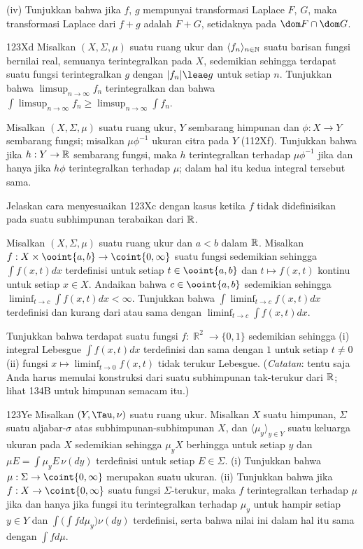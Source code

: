 {\quad(iv) Tunjukkan bahwa jika $f$, $g$ mempunyai transformasi Laplace
$F$, $G$, maka transformasi Laplace dari $f+g$ adalah $F+G$,
setidaknya pada $\dom F\cap \dom
G$.

\spheader 123Xd Misalkan $(X,\Sigma,\mu)$ suatu ruang ukur
dan $\langle f_n\rangle_{n\in\Bbb N}$ suatu barisan fungsi bernilai
real, semuanya terintegralkan pada $X$, sedemikian sehingga terdapat
suatu fungsi terintegralkan $g$ dengan $|f_n|\leae g$ untuk setiap $n$.
Tunjukkan bahwa $\limsup_{n\to\infty}f_n$ terintegralkan dan bahwa
$\int\limsup_{n\to\infty}f_n\ge\limsup_{n\to\infty}\int f_n$.

Misalkan $(X,\Sigma,\mu)$ suatu ruang ukur, $Y$ sembarang himpunan dan
$\phi:X\to Y$ sembarang fungsi; misalkan $\mu\phi^{-1}$ ukuran citra
pada $Y$ (112Xf). Tunjukkan bahwa jika $h:Y\to\Bbb R$ sembarang
fungsi, maka $h$ terintegralkan terhadap $\mu\phi^{-1}$ jika dan hanya
jika $h\phi$ terintegralkan terhadap $\mu$; dalam hal itu kedua integral
tersebut sama.

 Jelaskan cara menyesuaikan 123Xc dengan kasus
ketika $f$ tidak didefinisikan pada suatu subhimpunan terabaikan dari
$\Bbb R$.

 Misalkan $(X,\Sigma,\mu)$ suatu ruang ukur dan
$a<b$ dalam $\Bbb R$. Misalkan
$f:X\times\ooint{a,b}\to\coint{0,\infty}$ suatu fungsi sedemikian
sehingga $\int f(x,t)dx$ terdefinisi untuk setiap $t\in\ooint{a,b}$
dan $t\mapsto f(x,t)$ kontinu untuk setiap $x\in X$. Andaikan bahwa
$c\in\ooint{a,b}$ sedemikian sehingga
$\liminf_{t\to c}\int f(x,t)dx<\infty$.
Tunjukkan bahwa $\int\liminf_{t\to c}f(x,t)dx$ terdefinisi dan kurang
dari atau sama dengan $\liminf_{t\to c}\int f(x,t)dx$.

 Tunjukkan bahwa terdapat suatu fungsi
$f:\BbbR^2\to\{0,1\}$ sedemikian sehingga (i) integral Lebesgue
$\int f(x,t)dx$ terdefinisi dan sama dengan $1$ untuk setiap $t\ne 0$
(ii) fungsi $x\mapsto\liminf_{t\to 0}f(x,t)$ tidak terukur Lebesgue.
({\it Catatan\/}: tentu saja Anda harus memulai konstruksi dari suatu
subhimpunan tak-terukur dari $\Bbb R$; lihat 134B untuk himpunan
semacam itu.)

\spheader 123Ye Misalkan $(Y,\Tau,\nu)$ suatu ruang ukur. Misalkan $X$
suatu himpunan, $\Sigma$ suatu aljabar-$\sigma$ atas
subhimpunan-subhimpunan $X$, dan
$\langle\mu_y\rangle_{y\in Y}$ suatu keluarga ukuran pada $X$
sedemikian sehingga $\mu_yX$ berhingga untuk setiap $y$ dan
$\mu E=\int\mu_yE\,\nu(dy)$ terdefinisi untuk setiap $E\in\Sigma$.
(i) Tunjukkan bahwa $\mu:\Sigma\to\coint{0,\infty}$ merupakan suatu
ukuran. (ii) Tunjukkan bahwa jika
$f:X\to\coint{0,\infty}$ suatu fungsi $\Sigma$-terukur, maka $f$
terintegralkan terhadap $\mu$ jika dan hanya jika fungsi itu
terintegralkan terhadap $\mu_y$ untuk hampir setiap $y\in Y$ dan
$\int\bigl(\int fd\mu_y\bigr)\nu(dy)$ terdefinisi, serta bahwa nilai
ini dalam hal itu sama dengan $\int fd\mu$.

}

